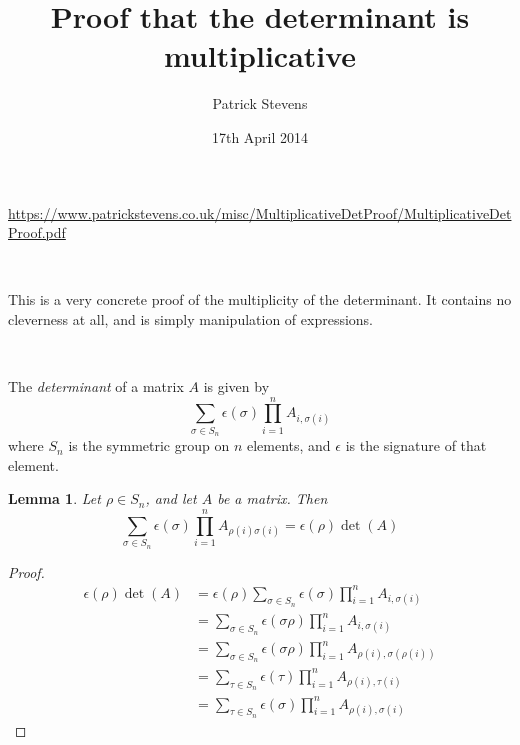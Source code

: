 \documentclass[11pt]{amsart}
\title{Proof that the determinant is multiplicative}
\author{Patrick Stevens}
\date{17th April 2014}
\newtheorem{lemma}[theorem]{Lemma}
\newenvironment{definition}[1][Definition]{\begin{trivlist}
\item[\hskip \labelsep {\bfseries #1}]}{\end{trivlist}}
\begin{document}
\maketitle

\tiny \begin{center} \url{https://www.patrickstevens.co.uk/misc/MultiplicativeDetProof/MultiplicativeDetProof.pdf} \end{center}

\normalsize

\

This is a very concrete proof of the multiplicity of the determinant.
It contains no cleverness at all, and is simply manipulation of expressions.

\

\begin{definition}
The \emph{determinant} of a matrix $A$ is given by $$\sum_{\sigma \in S_n} \epsilon(\sigma) \prod_{i=1}^n A_{i, \sigma(i)}$$
where $S_n$ is the symmetric group on $n$ elements, and $\epsilon$ is the signature of that element.
\end{definition}

\begin{lemma}
Let $\rho \in S_n$, and let $A$ be a matrix. Then
$$\sum_{\sigma \in S_n} \epsilon(\sigma) \prod_{i=1}^n A_{\rho(i) \sigma(i)} = \epsilon(\rho) \det(A)$$ 
\end{lemma}

\begin{proof}
\begin{align*}
\epsilon(\rho) \det(A) &= \epsilon(\rho) \sum_{\sigma \in S_n} \epsilon(\sigma) \prod_{i=1}^n A_{i, \sigma(i)}
\\&= \sum_{\sigma \in S_n} \epsilon(\sigma \rho) \prod_{i=1}^n A_{i, \sigma(i)}
\\&= \sum_{\sigma \in S_n} \epsilon(\sigma \rho) \prod_{i=1}^n A_{\rho(i), \sigma(\rho(i))}
\\&= \sum_{\tau \in S_n} \epsilon(\tau) \prod_{i=1}^n A_{\rho(i), \tau(i)}
\\&= \sum_{\tau \in S_n} \epsilon(\sigma) \prod_{i=1}^n A_{\rho(i), \sigma(i)}
\end{align*}

\end{proof}
\end{document}
